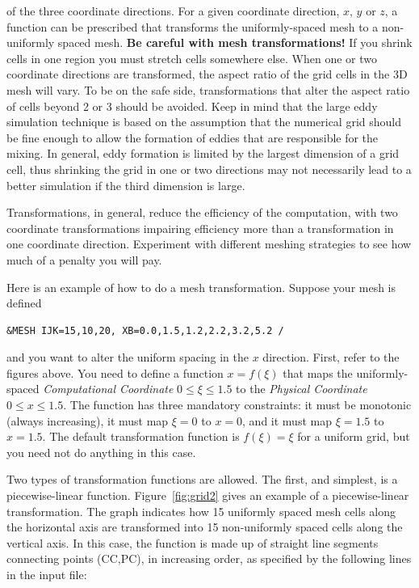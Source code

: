\documentclass[11pt]{book}
\begin{document}
of the three coordinate directions.
For a given coordinate direction, $x$, $y$ or $z$, a function can be
prescribed that transforms the uniformly-spaced mesh to a
non-uniformly spaced mesh. {\bf Be careful with mesh transformations!}  If you shrink cells in one
region you must stretch cells somewhere else. When one
or two coordinate directions are transformed, the aspect ratio of the
grid cells in the 3D mesh will vary. To be on the safe side, transformations
that alter the aspect ratio of cells beyond 2 or 3 should be avoided.
Keep in mind that the large eddy simulation technique is based on the
assumption that the numerical grid should be fine enough to allow the formation
of eddies that are responsible for the mixing. In general, eddy formation
is limited by the largest dimension of a grid cell, thus shrinking the
grid in one or two directions may not necessarily lead to a better
simulation if the third dimension is large.

\begin{warning}
\noindent
Transformations, in general, reduce the efficiency of the computation,
with two coordinate transformations impairing efficiency more
than a transformation in one coordinate direction. Experiment with different meshing
strategies to see how much of a penalty you will pay.
\end{warning}

\noindent
Here is an example of how to do a mesh transformation. Suppose your mesh is defined

\footnotesize
\begin{verbatim}
&MESH IJK=15,10,20, XB=0.0,1.5,1.2,2.2,3.2,5.2 /
\end{verbatim}
\normalsize

\noindent
and you want to alter the uniform spacing in the $x$ direction.
First, refer to the figures above.
You need to define a function $x = f(\xi)$ that maps the uniformly-spaced
{\em Computational Coordinate} $0 \le \xi \le 1.5$
to the {\em Physical Coordinate} $0 \le x \le 1.5$.
The function has three mandatory constraints: it must be monotonic (always increasing),
it must map $\xi=0$ to $x=0$, and it must map $\xi=1.5$ to $x=1.5$.
The default transformation function is $f(\xi) = \xi$ for a uniform grid, but you need not do
anything in this case.

Two types of transformation functions are allowed. The first, and
simplest, is a piecewise-linear function.
Figure~\ref{fig:grid2} gives an example of a piecewise-linear transformation.
The graph indicates how 15 uniformly spaced mesh cells
along the horizontal axis are transformed into 15 non-uniformly spaced cells along the vertical axis.
In this case, the function is made up of straight line segments
connecting points ({\ct CC},{\ct PC}), in increasing order, as specified by the following lines in the input file:
\end{document}
